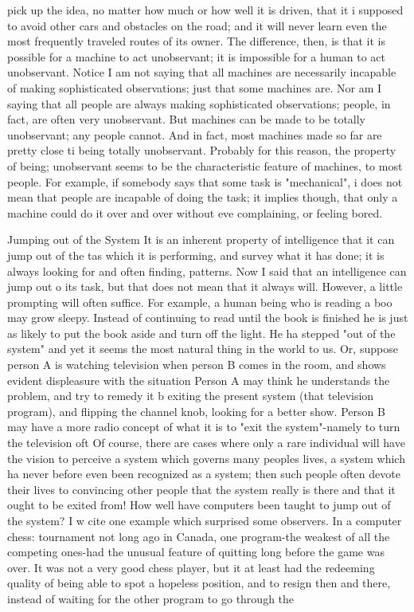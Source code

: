 pick up the idea, no matter how much or how well it is driven, that it i supposed to avoid other cars and obstacles on the road; and it will never learn even the most frequently traveled routes of its owner. The difference, then, is that it is possible for a machine to act unobservant; it is impossible for a human to act unobservant. Notice I am not saying that all machines are necessarily incapable of making sophisticated observations; just that some machines are. Nor am I saying that all people are always making sophisticated observations; people, in fact, are often very unobservant. But machines can be made to be totally unobservant; any people cannot. And in fact, most machines made so far are pretty close ti being totally unobservant. Probably for this reason, the property of being; unobservant seems to be the characteristic feature of machines, to most people. For example, if somebody says that some task is "mechanical", i does not mean that people are incapable of doing the task; it implies though, that only a machine could do it over and over without eve complaining, or feeling bored. 

Jumping out of the System It is an inherent property of intelligence that it can jump out of the tas which it is performing, and survey what it has done; it is always looking for and often finding, patterns. Now I said that an intelligence can jump out o its task, but that does not mean that it always will. However, a little prompting will often suffice. For example, a human being who is reading a boo may grow sleepy. Instead of continuing to read until the book is finished he is just as likely to put the book aside and turn off the light. He ha stepped "out of the system" and yet it seems the most natural thing in the world to us. Or, suppose person A is watching television when person B comes in the room, and shows evident displeasure with the situation Person A may think he understands the problem, and try to remedy it b exiting the present system (that television program), and flipping the channel knob, looking for a better show. Person B may have a more radio concept of what it is to "exit the system"-namely to turn the television oft Of course, there are cases where only a rare individual will have the vision to perceive a system which governs many peoples lives, a system which ha never before even been recognized as a system; then such people often devote their lives to convincing other people that the system really is there and that it ought to be exited from! How well have computers been taught to jump out of the system? I w cite one example which surprised some observers. In a computer chess: tournament not long ago in Canada, one program-the weakest of all the competing ones-had the unusual feature of quitting long before the game was over. It was not a very good chess player, but it at least had the redeeming quality of being able to spot a hopeless position, and to resign then and there, instead of waiting for the other program to go through the 







